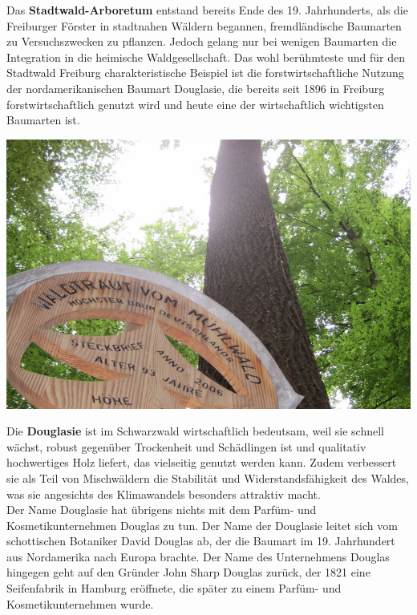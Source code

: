\documentclass[landscape, a4paper]{article}
\newcommand\alert[1]{\textcolor{PrimaryColor}{\textbf{#1}}}
\begin{document}
\hspace{0.4cm}
\begin{minipage}[t]{0.32\textwidth}
	\setlength{\parskip}{0.25cm}
	Das \alert{Stadtwald-Arboretum} entstand bereits Ende des 19. Jahrhunderts, als die Freiburger Förster in stadtnahen Wäldern begannen, fremdländische Baumarten zu Versuchszwecken zu pflanzen. Jedoch gelang nur bei wenigen Baumarten die Integration in die heimische Waldgesellschaft. Das wohl berühmteste und für den Stadtwald Freiburg charakteristische Beispiel ist die forstwirtschaftliche Nutzung der nordamerikanischen Baumart Douglasie, die bereits seit 1896 in Freiburg forstwirtschaftlich genutzt wird und heute eine der wirtschaftlich wichtigsten Baumarten ist.

	\includegraphics[width=\linewidth]{./figures/waldraud.png}
	\setlength{\parskip}{0.25cm}
	\vspace{0.15cm}

	Die \alert{Douglasie} ist im Schwarzwald wirtschaftlich bedeutsam, weil sie schnell wächst, robust gegenüber Trockenheit und Schädlingen ist und qualitativ hochwertiges Holz liefert, das vielseitig genutzt werden kann. Zudem verbessert sie als Teil von Mischwäldern die Stabilität und Widerstandsfähigkeit des Waldes, was sie angesichts des Klimawandels besonders attraktiv macht.\\
	Der Name Douglasie hat übrigens nichts mit dem Parfüm- und Kosmetikunternehmen Douglas zu tun. Der Name der Douglasie leitet sich vom schottischen Botaniker David Douglas ab, der die Baumart im 19. Jahrhundert aus Nordamerika nach Europa brachte. Der Name des Unternehmens Douglas hingegen geht auf den Gründer John Sharp Douglas zurück, der 1821 eine Seifenfabrik in Hamburg eröffnete, die später zu einem Parfüm- und Kosmetikunternehmen wurde.


\end{minipage}
\end{document}
